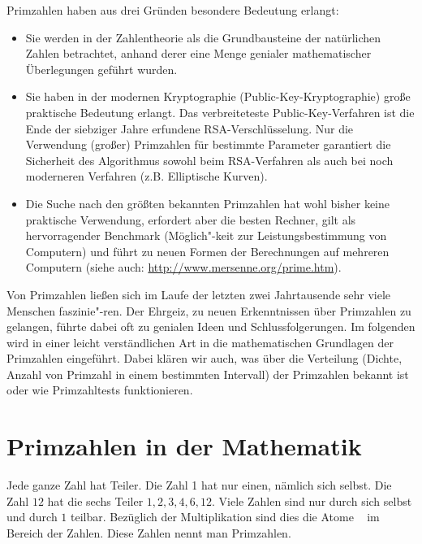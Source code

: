 \begin{refsegment}
\noindent Primzahlen haben aus drei Gründen besondere Bedeutung erlangt:
\begin{itemize}
  \item Sie werden in der Zahlentheorie als die Grundbausteine der
        natürlichen Zahlen betrachtet, anhand derer eine Menge genialer
        mathematischer Überlegungen geführt wurden.
  \item Sie haben in der modernen  Kryptographie
        (Public-Key-Kryptographie) große
        praktische Bedeutung erlangt. Das verbreiteteste Public-Key-Verfahren
        ist die Ende der siebziger Jahre erfundene 
        RSA-Verschlüsselung. Nur die Verwendung (großer) Primzahlen für
        bestimmte Parameter garantiert die Sicherheit des Algorithmus sowohl
        beim RSA-Verfahren als auch bei noch moderneren Verfahren
        (z.B. Elliptische Kurven).
  \item Die Suche nach den größten bekannten Primzahlen hat wohl bisher
        keine praktische Verwendung, erfordert aber die besten Rechner, gilt
        als hervorragender Benchmark (Möglich"-keit zur Leistungsbestimmung von
        Computern) und führt zu neuen Formen der Berechnungen auf mehreren
        Computern (siehe auch: \url{http://www.mersenne.org/prime.htm}).
\end{itemize}
Von Primzahlen ließen sich im Laufe der letzten zwei Jahrtausende sehr viele
Menschen faszinie"-ren.
Der Ehrgeiz, zu neuen Erkenntnissen über Primzahlen zu gelangen, führte
dabei oft zu genialen Ideen und Schlussfolgerungen.
Im folgenden wird in einer leicht verständlichen Art in die mathematischen
Grundlagen der Primzahlen eingeführt. Dabei klären wir auch, was über die
Verteilung (Dichte, Anzahl von Primzahl in einem bestimmten Intervall) der
Primzahlen bekannt ist oder wie Primzahltests funktionieren.


\section{Primzahlen in der Mathematik}\label{primesinmath}

Jede ganze Zahl hat Teiler. Die Zahl 1 hat nur einen, nämlich
sich selbst. Die Zahl $12$ hat die sechs Teiler $1, 2, 3, 4, 6,
12$. Viele Zahlen sind nur durch sich selbst und durch $1$ teilbar.
Bezüglich der Multiplikation sind dies die \glqq Atome\grqq
~ im Bereich der Zahlen. Diese Zahlen nennt man Primzahlen.


\end{refsegment}
